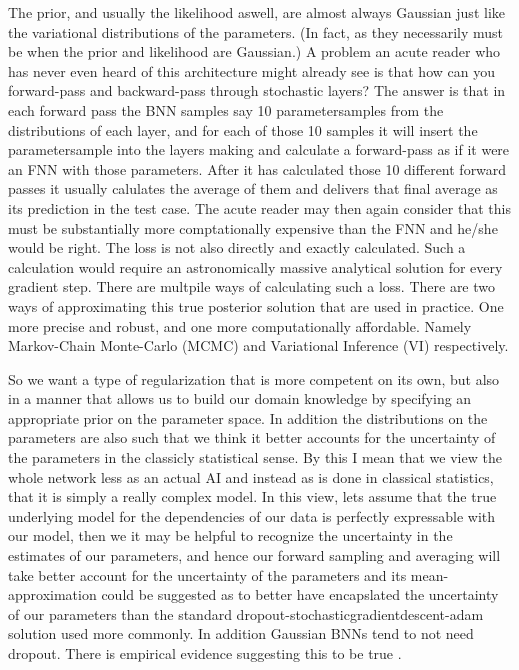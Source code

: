 \documentclass[nofootinbib,UKenglish,nobalancelastpage,12pt]{article}
\begin{document}
The prior, and usually the likelihood aswell, are almost always Gaussian just like the variational distributions of the parameters. (In fact, as they necessarily must be when the prior and likelihood are Gaussian.) A problem an acute reader who has never even heard of this architecture might already see is that how can you forward-pass and backward-pass through stochastic layers? The answer is that in each forward pass the BNN samples say 10 parametersamples from the distributions of each layer, and for each of those 10 samples it will insert the parametersample into the layers making and calculate a forward-pass as if it were an FNN with those parameters. After it has calculated those 10 different forward passes it usually calulates the average of them and delivers that final average as its prediction in the test case. The acute reader may then again consider that this must be substantially more comptationally expensive than the FNN and he/she would be right. The loss is not also directly and exactly calculated. Such a calculation would require an astronomically massive analytical solution for every gradient step. There are multpile ways of calculating such a loss. There are two ways of approximating this true posterior solution that are used in practice. One more precise and robust, and one more computationally affordable. Namely Markov-Chain Monte-Carlo (MCMC) and Variational Inference (VI) respectively.

So we want a type of regularization that is more competent on its own, but also in a manner that allows us to build our domain knowledge by specifying an appropriate prior on the parameter space. In addition the distributions on the parameters are also such that we think it better accounts for the uncertainty of the parameters in the classicly statistical sense. By this I mean that we view the whole network less as an actual AI and instead as is done in classical statistics, that it is simply a really complex model. In this view, lets assume that the true underlying model for the dependencies of our data is perfectly expressable with our model, then we it may be helpful to recognize the uncertainty in the estimates of our parameters, and hence our forward sampling and averaging will take better account for the uncertainty of the parameters and its mean-approximation could be suggested as to better have encapslated the uncertainty of our parameters than the standard dropout-stochasticgradientdescent-adam solution used more commonly. In addition Gaussian BNNs tend to not need dropout. There is empirical evidence suggesting this to be true \cite{Vincent_revisited}. 
\end{document}
